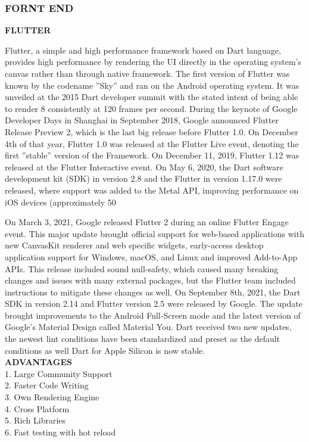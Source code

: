 \documentclass[12pt,a4paper,final]{extreport}
\begin{document}
\subsubsection{FORNT END}
\textbf{FLUTTER}
\par
\hspace{01.5cm}Flutter, a simple and high performance framework based on Dart language,
provides high performance by rendering the UI directly in the operating system’s
canvas rather than through native framework. The first version of Flutter was known
by the codename ”Sky” and ran on the Android operating system. It was unveiled
at the 2015 Dart developer summit with the stated intent of being able to render
8
consistently at 120 frames per second. During the keynote of Google Developer
Days in Shanghai in September 2018, Google announced Flutter Release Preview
2, which is the last big release before Flutter 1.0. On December 4th of that year,
Flutter 1.0 was released at the Flutter Live event, denoting the first ”stable” version
of the Framework. On December 11, 2019, Flutter 1.12 was released at the Flutter Interactive event. On May 6, 2020, the Dart software development kit (SDK)
in version 2.8 and the Flutter in version 1.17.0 were released, where support was
added to the Metal API, improving performance on iOS devices (approximately
50%
\par
On March 3, 2021, Google released Flutter 2 during an online Flutter Engage event. This major update brought official support for web-based applications
with new CanvasKit renderer and web specific widgets, early-access desktop application support for Windows, macOS, and Linux and improved Add-to-App APIs.
This release included sound null-safety, which caused many breaking changes and
issues with many external packages, but the Flutter team included instructions to
mitigate these changes as well. On September 8th, 2021, the Dart SDK in version
2.14 and Flutter version 2.5 were released by Google. The update brought improvements to the Android Full-Screen mode and the latest version of Google’s Material
Design called Material You. Dart received two new updates, the newest lint conditions have been standardized and preset as the default conditions as well Dart for
Apple Silicon is now stable.\\
\textbf{ADVANTAGES}\\
1. Large Community Support\\
2. Faster Code Writing\\
3. Own Rendering Engine\\
4. Cross Platform\\
5. Rich Libraries\\
6. Fast testing with hot reload\\
\end{document}
